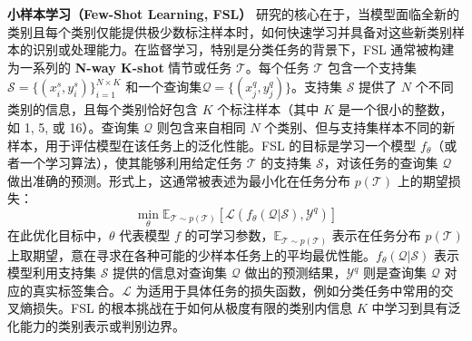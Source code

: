\documentclass[../main.tex]{subfiles}
\begin{document}
\textbf{小样本学习（Few-Shot Learning, FSL）} 研究的核心在于，当模型面临全新的类别且每个类别仅能提供极少数标注样本时，如何快速学习并具备对这些新类别样本的识别或处理能力。在监督学习，特别是分类任务的背景下，FSL 通常被构建为一系列的 \textbf{N-way K-shot} 情节或任务 $\mathcal{T}$。每个任务 $\mathcal{T}$ 包含一个支持集$\mathcal{S} = \{(x_i^s, y_i^s)\}_{i=1}^{N \times K}$ 和一个查询集$\mathcal{Q} = \{(x_j^q, y_j^q)\}$。支持集 $\mathcal{S}$ 提供了 $N$ 个不同类别的信息，且每个类别恰好包含 $K$ 个标注样本（其中 $K$ 是一个很小的整数，如 1, 5, 或 16）。查询集 $\mathcal{Q}$ 则包含来自相同 $N$ 个类别、但与支持集样本不同的新样本，用于评估模型在该任务上的泛化性能。FSL 的目标是学习一个模型 $f_\theta$（或者一个学习算法），使其能够利用给定任务 $\mathcal{T}$ 的支持集 $\mathcal{S}$，对该任务的查询集 $\mathcal{Q}$ 做出准确的预测。形式上，这通常被表述为最小化在任务分布 $p(\mathcal{T})$ 上的期望损失：
\begin{equation}
	\min_\theta \mathbb{E}_{\mathcal{T} \sim p(\mathcal{T})} \left[ \mathcal{L}\left(f_\theta(\mathcal{Q}|\mathcal{S}), \mathcal{Y}^q\right) \right]
	\label{eq:fsl_objective}
\end{equation}
在此优化目标中，$\theta$ 代表模型 $f$ 的可学习参数，$\mathbb{E}_{\mathcal{T} \sim p(\mathcal{T})}$ 表示在任务分布 $p(\mathcal{T})$ 上取期望，意在寻求在各种可能的少样本任务上的平均最优性能。$f_\theta(\mathcal{Q}|\mathcal{S})$ 表示模型利用支持集 $\mathcal{S}$ 提供的信息对查询集 $\mathcal{Q}$ 做出的预测结果，$\mathcal{Y}^q$ 则是查询集 $\mathcal{Q}$ 对应的真实标签集合。$\mathcal{L}$ 为适用于具体任务的损失函数，例如分类任务中常用的交叉熵损失。FSL 的根本挑战在于如何从极度有限的类别内信息 $K$ 中学习到具有泛化能力的类别表示或判别边界\cite{matchingnetworksone_vinyals_2016,prototypicalnetworksfew_snell_2017,modelagnosticmeta_finn_2017}。
\end{document}

